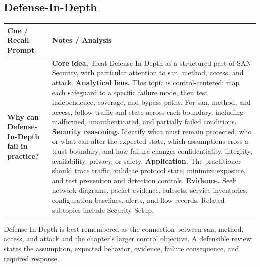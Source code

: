 \documentclass[11pt]{article}
\newcommand{\CornellHeader}{%
\rowcolor{Navy}\color{white}\bfseries Cue / Recall Prompt & \color{white}\bfseries Notes / Analysis\\\hline}
\newcommand{\CornellRow}[2]{%
\cellcolor{CueGray}\RaggedRight\textbf{#1} & \RaggedRight #2\\\hline}
\begin{document}
\subsection*{Defense-In-Depth}
\begin{longtable}{>{\RaggedRight\arraybackslash}p{}|>{\RaggedRight\arraybackslash}p{}}
\CornellHeader
\CornellRow{Why can Defense-In-Depth fail in practice?}{\textbf{Core idea.} Treat Defense-In-Depth as a structured part of SAN Security, with particular attention to san, method, access, and attack. \textbf{Analytical lens.} This topic is control-centered: map each safeguard to a specific failure mode, then test independence, coverage, and bypass paths. For san, method, and access, follow traffic and state across each boundary, including malformed, unauthenticated, and partially failed conditions. \textbf{Security reasoning.} Identify what must remain protected, who or what can alter the expected state, which assumptions cross a trust boundary, and how failure changes confidentiality, integrity, availability, privacy, or safety. \textbf{Application.} The practitioner should trace traffic, validate protocol state, minimize exposure, and test prevention and detection controls. \textbf{Evidence.} Seek network diagrams, packet evidence, rulesets, service inventories, configuration baselines, alerts, and flow records. Related subtopics include Security Setup.}
\end{longtable}
\begin{topicsummary}
Defense-In-Depth is best remembered as the connection between san, method, access, and attack and the chapter's larger control objective. A defensible review states the assumption, expected behavior, evidence, failure consequence, and required response.
\end{topicsummary}
\end{document}
